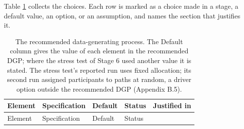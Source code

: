 \documentclass[
  11pt,
]{article}
\begin{document}
Table \ref{tab:spec} collects the choices. Each row is marked as a
choice made in a stage, a default value, an option, or an assumption,
and names the section that justifies it.

\begin{longtable}[]{@{}
  >{\raggedright\arraybackslash}p{}
  >{\raggedright\arraybackslash}p{}
  >{\raggedright\arraybackslash}p{}
  >{\raggedright\arraybackslash}p{}
  >{\raggedright\arraybackslash}p{}@{}}
\caption{\label{tab:spec} The recommended data-generating process. The Default column gives the value of each element in the recommended DGP; where the stress test of Stage 6 used another value it is stated. The stress test's reported run uses fixed allocation; its second run assigned participants to paths at random, a driver option outside the recommended DGP (Appendix B.5).}\tabularnewline
\toprule\noalign{}
\begin{minipage}[b]{\linewidth}\raggedright
Element
\end{minipage} & \begin{minipage}[b]{\linewidth}\raggedright
Specification
\end{minipage} & \begin{minipage}[b]{\linewidth}\raggedright
Default
\end{minipage} & \begin{minipage}[b]{\linewidth}\raggedright
Status
\end{minipage} & \begin{minipage}[b]{\linewidth}\raggedright
Justified in
\end{minipage} \\
\midrule\noalign{}
\endfirsthead
\toprule\noalign{}
\begin{minipage}[b]{\linewidth}\raggedright
Element
\end{minipage} & \begin{minipage}[b]{\linewidth}\raggedright
Specification
\end{minipage} & \begin{minipage}[b]{\linewidth}\raggedright
Default
\end{minipage} & \begin{minipage}[b]{\linewidth}\raggedright
Status
\end{minipage} & \begin{minipage}[b]{\linewidth}\raggedright

\end{minipage}
\end{longtable}
\end{document}
